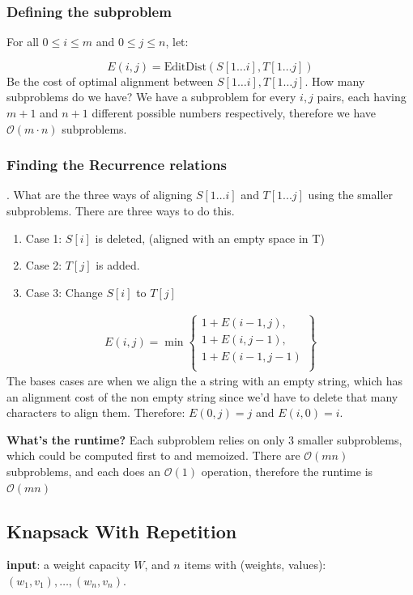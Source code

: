 \documentclass[12pt]{article}
\renewcommand{\O}{\mathcal{O}}
\begin{document}
\subsubsection*{Defining the subproblem}
For all $0 \le i \le m$ and $0 \le j \le n$, let:

$$
    E(i, j) = \text{EditDist}(S[1\dots i], T[1\dots j])
$$
Be the cost of optimal alignment between $S[1\dots i], T[1\dots j]$. How many subproblems do we have? We have a subproblem for every $i, j$ pairs, each having $m + 1$ and $n + 1$ different possible numbers respectively, therefore we have $\O(m\cdot n)$ subproblems.

\subsubsection{Finding the Recurrence relations}.
What are the three ways of aligning $S[1\dots i]$ and $T[1 ... j]$ using the smaller subproblems. There are three ways to do this.
\begin{enumerate}
    \item Case 1: $S[i]$ is deleted, (aligned with an empty space in T)
    \item Case 2: $T[j]$ is added.
    \item Case 3: Change $S[i]$ to $T[j]$
\end{enumerate}
\begin{align*}
    E(i, j) =
    \min \left\{
    \begin{array}{c}
        1 + E(i - 1, j),    \\
        1 + E(i, j - 1),    \\
        1 + E(i - 1, j - 1) \\
    \end{array}
    \right\}
\end{align*}
The bases cases are when we align the a string with an empty string, which has an alignment cost of the non empty string since we'd have to delete that many characters to align them. Therefore: $E(0, j) = j$ and $E(i, 0) = i$.

\textbf{What's the runtime?} Each subproblem relies on only 3 smaller subproblems, which could be computed first to and memoized. There are $\O(mn)$ subproblems, and each does an $\O(1)$ operation, therefore the runtime is $\O(mn)$

\subsection{Knapsack With Repetition}
\textbf{input}: a weight capacity $W$, and $n$ items with (weights, values): $(w_1, v_1), \dots , (w_n, v_n)$.
\end{document}
